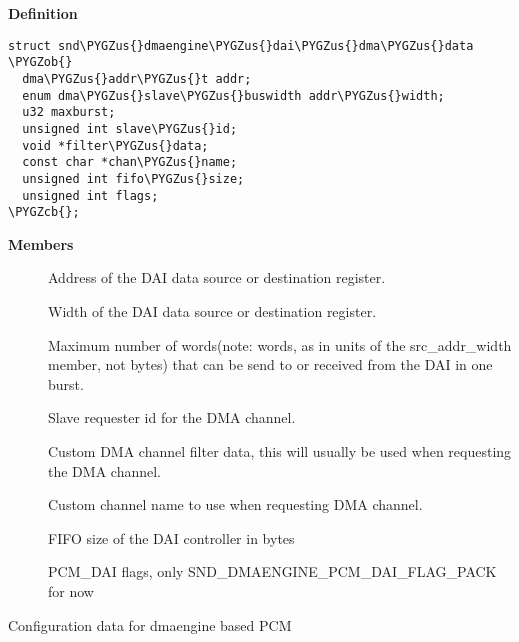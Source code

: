 \documentclass[a4paper,8pt,english]{sphinxmanual}
\def\PYGZus{\char`\_}
\def\PYGZob{\char`\{}
\def\PYGZcb{\char`\}}
\begin{document}
\textbf{Definition}

\begin{Verbatim}[commandchars=\\\{\}]
struct snd\PYGZus{}dmaengine\PYGZus{}dai\PYGZus{}dma\PYGZus{}data \PYGZob{}
  dma\PYGZus{}addr\PYGZus{}t addr;
  enum dma\PYGZus{}slave\PYGZus{}buswidth addr\PYGZus{}width;
  u32 maxburst;
  unsigned int slave\PYGZus{}id;
  void *filter\PYGZus{}data;
  const char *chan\PYGZus{}name;
  unsigned int fifo\PYGZus{}size;
  unsigned int flags;
\PYGZcb{};
\end{Verbatim}

\textbf{Members}
\begin{description}
\item[{}] \leavevmode
Address of the DAI data source or destination register.

\item[{}] \leavevmode
Width of the DAI data source or destination register.

\item[{}] \leavevmode
Maximum number of words(note: words, as in units of the
src\_addr\_width member, not bytes) that can be send to or received from the
DAI in one burst.

\item[{}] \leavevmode
Slave requester id for the DMA channel.

\item[{}] \leavevmode
Custom DMA channel filter data, this will usually be used when
requesting the DMA channel.

\item[{}] \leavevmode
Custom channel name to use when requesting DMA channel.

\item[{}] \leavevmode
FIFO size of the DAI controller in bytes

\item[{}] \leavevmode
PCM\_DAI flags, only SND\_DMAENGINE\_PCM\_DAI\_FLAG\_PACK for now

\end{description}

\begin{fulllineitems}
\label{sound/kernel-api/alsa-driver-api:c.snd_dmaengine_pcm_config}
Configuration data for dmaengine based PCM

\end{fulllineitems}
\end{document}
